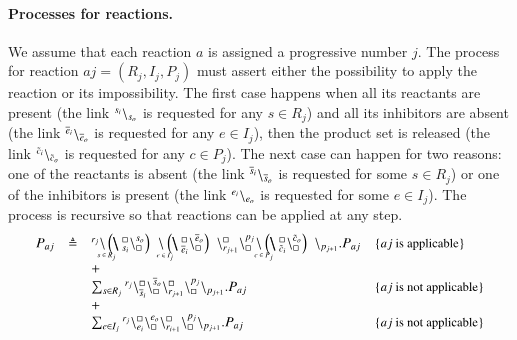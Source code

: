 \paragraph{Processes for reactions.}
We assume that each reaction $a$ is assigned a progressive number $j$.
The process for reaction $aj=(R_j,I_j,P_j)$ must assert either the possibility to apply the reaction or its impossibility.
The first case happens when all its reactants are present (the link ${}^{s_i} \backslash_{s_o}$ is requested for any $s\in R_j$) and all its inhibitors are absent (the link ${}^{\overline{e}_i} \backslash_{\overline{e}_o}$ is requested for any $e\in I_j$), then the product set is released (the link ${}^{\tilde{c}_i} \backslash_{\tilde{c}_o}$ is requested for any $c\in P_j$).
The next case can happen for two reasons: one of the reactants is absent (the link ${}^{\overline{s}_i} \backslash_{\overline{s}_o}$ is requested for some $s\in R_j$) or one of the inhibitors is present (the link ${}^{e_i} \backslash_{e_o}$ is requested for some $e\in I_j$).
The process is recursive so that reactions can be applied at any step.
\[
\begin{array}{lcl@{\quad}l}
P_{aj}& \defeq & 
 ^{r_j} \backslash  \blockchain{s_i}{s_o}{s \in R_j} \, \link{}{} \blockchain{\overline{e}_i}{\overline{e}_o}{e \in I_j} \, \chainedlink{r_{j+1}}{\noact}\chainedlink{\noact}{p_j}\link{}{} \blockchain{\tilde{c}_i}{\tilde{c}_o}{c \in P_j}\, \backslash_{p_{j+1}}.P_{aj} & \mbox{\small  \{$aj$ is applicable\}}\\
&& + \ \\
&& \sum_{s\in R_j}\startchain{r_j}\chainedlink{\overline{s}_i}{\noact}\chainedlink{\noact}{\overline{s}_o} \chainedlink{r_{j+1}}{\noact}\chainedlink{\noact}{p_{j}}\chainend{p_{j+1}}.P_{aj}  & \mbox{\small  \{$aj$ is not applicable\}}\\
&&+\\
&& \sum_{e\in I_j}\startchain{r_j}\chainedlink{e_i}{\noact} \chainedlink{\noact}{e_o} \chainedlink{r_{i+1}}{\noact}\chainedlink{\noact}{p_{j}}\chainend{p_{j+1}}.P_{aj}  & \mbox{\small \{$aj$ is not applicable\}}\\
\end{array}
\]

